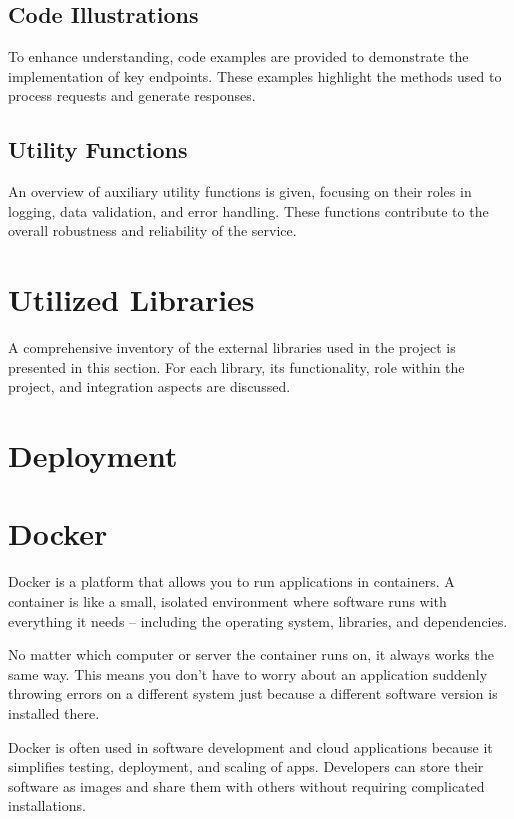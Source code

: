 \subsection{Code Illustrations}
To enhance understanding, code examples are provided to demonstrate the implementation of key endpoints. These examples highlight the methods used to process requests and generate responses.
\subsection{Utility Functions}
An overview of auxiliary utility functions is given, focusing on their roles in logging, data validation, and error handling. These functions contribute to the overall robustness and reliability of the service.


\section{Utilized Libraries}
A comprehensive inventory of the external libraries used in the project is presented in this section. For each library, its functionality, role within the project, and integration aspects are discussed.


\section{Deployment}



\section{Docker}
\label{sec:docker}
Docker is a platform that allows you to run applications in containers. A container is like a small, isolated environment where software runs with everything it needs – including the operating system, libraries, and dependencies.

No matter which computer or server the container runs on, it always works the same way. This means you don’t have to worry about an application suddenly throwing errors on a different system just because a different software version is installed there.

Docker is often used in software development and cloud applications because it simplifies testing, deployment, and scaling of apps. Developers can store their software as images and share them with others without requiring complicated installations.

